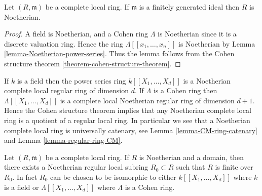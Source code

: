 \begin{lemma}
\label{lemma-complete-local-ring-Noetherian}
Let $(R, \mathfrak m)$ be a complete local ring.
If $\mathfrak m$ is a finitely generated ideal then
$R$ is Noetherian.
\end{lemma}

\begin{proof}
A field is Noetherian, and a Cohen ring $\Lambda$ is Noetherian since
it is a discrete valuation ring. Hence the ring $\Lambda[[x_1, \ldots, x_n]]$
is Noetherian by Lemma \ref{lemma-Noetherian-power-series}.
Thus the lemma follows from the Cohen
structure theorem \ref{theorem-cohen-structure-theorem}.
\end{proof}

\begin{remark}
\label{remark-Noetherian-complete-local-ring-universally-catenary}
If $k$ is a field then the power series ring $k[[X_1, \ldots, X_d]]$
is a Noetherian complete local regular ring of dimension $d$.
If $\Lambda$ is a Cohen ring then $\Lambda[[X_1, \ldots, X_d]]$
is a complete local Noetherian regular ring of dimension $d + 1$.
Hence the Cohen structure theorem implies that any Noetherian
complete local ring is a quotient of a regular local ring.
In particular we see that a Noetherian complete local ring is
universally catenary, see Lemma \ref{lemma-CM-ring-catenary}
and Lemma \ref{lemma-regular-ring-CM}.
\end{remark}

\begin{lemma}
\label{lemma-complete-local-Noetherian-domain-finite-over-regular}
Let $(R, \mathfrak m)$ be a complete local ring.
If $R$ is Noetherian and a domain, then there exists a
Noetherian regular local subring $R_0 \subset R$ such that $R$ is
finite over $R_0$. In fact $R_0$ can be chosen to be isomorphic
to either $k[[X_1, \ldots, X_d]]$ where $k$ is a field or
$\Lambda[[X_1, \ldots, X_d]]$ where $\Lambda$ is a Cohen ring.
\end{lemma}

